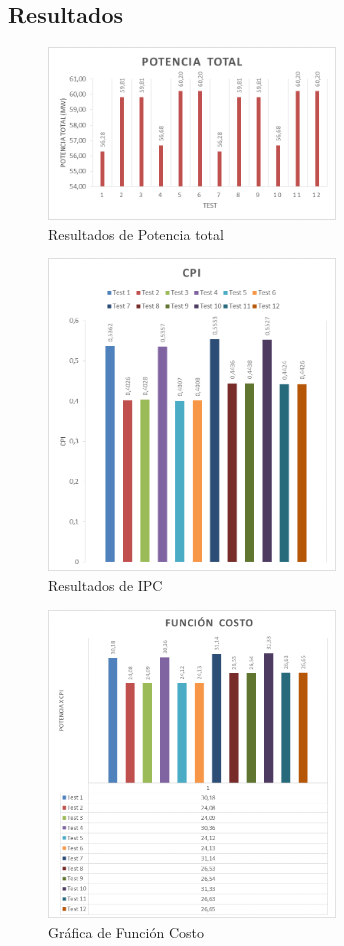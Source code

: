 \documentclass[journal]{IEEEtran}
\begin{document}
\subsection{Resultados}

\begin{figure}[!ht]
        \begin{center}
        \includegraphics[width=3in]{fig1.png}
        \caption{Resultados de Potencia total}
        \end{center}
\end{figure}

\begin{figure}[!ht]
        \begin{center}
        \includegraphics[width=3in]{fig2.png}
        \caption{Resultados de IPC}
        \end{center}
\end{figure}

\begin{figure}[!ht]
        \begin{center}
        \includegraphics[width=3in]{fig3.png}
        \caption{Gr\'{a}fica de Funci\'{o}n Costo}
        \end{center}
\end{figure}
\end{document}

